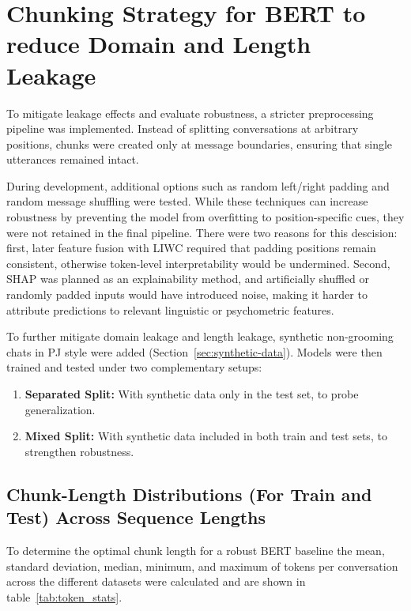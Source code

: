\section{Chunking Strategy for BERT to reduce Domain and Length Leakage}

To mitigate leakage effects and evaluate robustness, a stricter preprocessing pipeline was implemented. Instead of splitting conversations at arbitrary positions, chunks were created only at message boundaries, ensuring that single utterances remained intact.

During development, additional options such as random left/right padding and random message shuffling were tested. While these techniques can increase robustness by preventing the model from overfitting to position-specific cues, they were not retained in the final pipeline. There were two reasons for this descision: first, later feature fusion with LIWC required that padding positions remain consistent, otherwise token-level interpretability would be undermined. Second, SHAP was planned as an explainability method, and artificially shuffled or randomly padded inputs would have introduced noise, making it harder to attribute predictions to relevant linguistic or psychometric features.

To further mitigate domain leakage and length leakage, synthetic non-grooming chats in PJ style were added (Section~\ref{sec:synthetic-data}). Models were then trained and tested under two complementary setups: 

\begin{enumerate}
  \item \textbf{Separated Split:} With synthetic data only in the test set, to probe generalization.
  \item \textbf{Mixed Split:} With synthetic data included in both train and test sets, to strengthen robustness.
\end{enumerate}


\subsection{Chunk-Length Distributions (For Train and Test) Across Sequence Lengths}\label{sec:chunk-length-distributions}

To determine the optimal chunk length for a robust BERT baseline the mean, standard deviation, median, minimum, and maximum of tokens per conversation across the different datasets were calculated and are shown in table~\ref{tab:token_stats}. 


